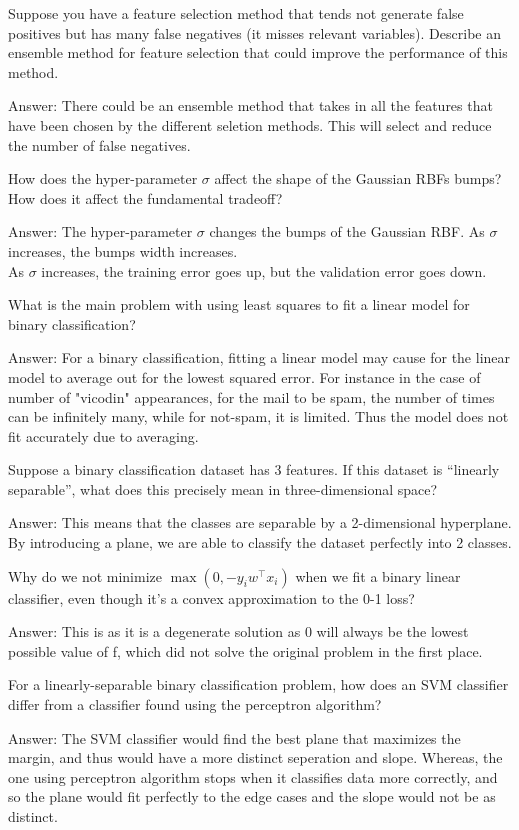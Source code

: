 \documentclass{article}
\def\ans#1{\par\gre{Answer: #1}}
\def\gre#1{{\color{gre}#1}}
\begin{document}
{\item Suppose you have a feature selection method that tends not generate false positives but has many false negatives (it misses relevant variables). Describe an ensemble method for feature selection that could improve the performance of this method.
\ans{There could be an ensemble method that takes in all the features that have been chosen by the different seletion methods. This will select and reduce the number of false negatives.}
\item How does the hyper-parameter $\sigma$ affect the shape of the Gaussian RBFs bumps? How does it affect the fundamental tradeoff?
\ans{The hyper-parameter $\sigma$ changes the bumps of the Gaussian RBF. As $\sigma$ increases, the bumps width increases. \\
As $\sigma$ increases, the training error goes up, but the validation error goes down.}
\item What is the main problem with using least squares to fit a linear model for binary classification?
\ans{For a binary classification, fitting a linear model may cause for the linear model to average out for the lowest squared error. For instance in the case of number of "vicodin" appearances, for the mail to be spam, the number of times can be infinitely many, while for not-spam, it is limited. Thus the model does not fit accurately due to averaging.}
\item Suppose a binary classification dataset has 3 features. If this dataset is ``linearly separable'', what does this precisely mean in three-dimensional space?
\ans{This means that the classes are separable by a 2-dimensional hyperplane. By introducing a plane, we are able to classify the dataset perfectly into 2 classes.}
\item Why do we not minimize $\max(0, -y_i w^\top x_i)$ when we fit a binary linear classifier, even though it’s a convex approximation to the 0-1 loss?
\ans{This is as it is a degenerate solution as 0 will always be the lowest possible value of f, which did not solve the original problem in the first place.}
\item For a linearly-separable binary classification problem, how does an SVM classifier differ from a classifier found using the perceptron algorithm?
\ans{The SVM classifier would find the best plane that maximizes the margin, and thus would have a more distinct seperation and slope. Whereas, the one using perceptron algorithm stops when it classifies data more correctly, and so the plane would fit perfectly to the edge cases and the slope would not be as distinct. }
}
\end{document}
